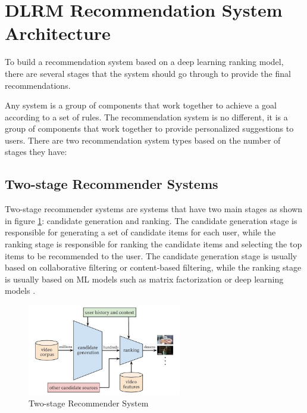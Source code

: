 

\section{DLRM Recommendation System Architecture}

To build a recommendation system based on a deep learning ranking model, there are several stages that the system should go through to provide the final recommendations.

Any system is a group of components that work together to achieve a goal according to a set of rules. The recommendation system is no different, it is a group of components that work together to provide personalized suggestions to users. There are two recommendation system types based on the number of stages they have:
\subsection{Two-stage Recommender Systems}
Two-stage recommender systems are systems that have two main stages as shown in figure \ref{fig:TwoStageRecSys}: candidate generation and ranking. The candidate generation stage is responsible for generating a set of candidate items for each user, while the ranking stage is responsible for ranking the candidate items and selecting the top items to be recommended to the user. The candidate generation stage is usually based on collaborative filtering or content-based filtering, while the ranking stage is usually based on ML models such as matrix factorization or deep learning models \cite{MultiStageRecSys}.
\begin{figure}[H]
    \centering
    \includegraphics[width=0.6\textwidth]{assets/Two_stage_rec_sys.jpg}
    \caption[Two-stage Recommender System]{Two-stage Recommender System\cite{MultiStageRecSys}}
    \label{fig:TwoStageRecSys}
\end{figure}
